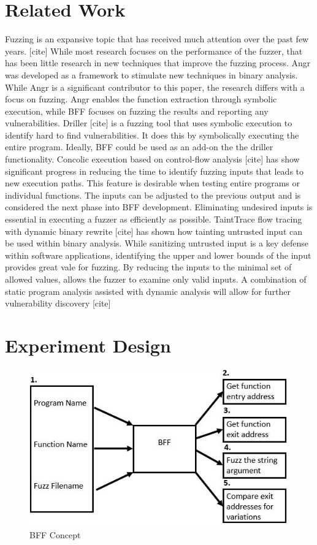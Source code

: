 \documentclass[conference]{IEEEtran}
\begin{document}
\section{Related Work}
Fuzzing is an expansive topic that has received much attention over the past few years. [cite] While most research focuses on the performance of the fuzzer, that has been little research in new techniques that improve the fuzzing process. Angr was developed as a framework to stimulate new techniques in binary analysis. While Angr is a significant contributor to this paper, the research differs with a focus on fuzzing. Angr enables the function extraction through symbolic execution, while BFF focuses on fuzzing the results and reporting any vulnerabilities. Driller [cite] is a fuzzing tool that uses symbolic execution to identify hard to find vulnerabilities. It does this by symbolically executing the entire program. Ideally, BFF could be used as an add-on the the driller functionality. Concolic execution based on control-flow analysis [cite] has show significant progress in reducing the time to identify fuzzing inputs that leads to new execution paths. This feature is desirable when testing entire programs or individual functions. The inputs can be adjusted to the previous output and is considered the next phase into BFF development. Eliminating undesired inputs is essential in executing a fuzzer as efficiently as possible. TaintTrace flow tracing with dynamic binary rewrite [cite] has shown how tainting untrusted input can be used within binary analysis. While sanitizing untrusted input is a key defense within software applications, identifying the upper and lower bounds of the input provides great vale for fuzzing. By reducing the inputs to the minimal set of allowed values, allows the fuzzer to examine only valid inputs. A combination of static program analysis assisted with dynamic analysis will allow for further vulnerability discovery [cite]

\section{Experiment Design}

\begin{figure}
  \includegraphics[width=\linewidth]{HowBFFWorks.JPG}
  \caption{BFF Concept}
  \label{fig:BFF_CONCEPT}
\end{figure}
\end{document}
